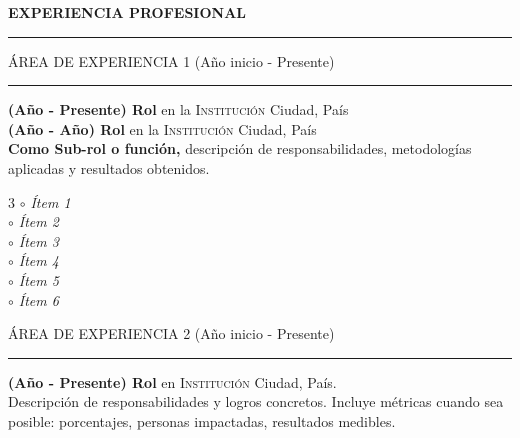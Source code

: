 \documentclass[10pt,a4paper]{article}
\begin{document}
\textbf{EXPERIENCIA PROFESIONAL}\vspace{-0.25cm}\\
\noindent\rule{\textwidth}{2pt}


\vspace{-0.1cm}ÁREA DE EXPERIENCIA 1 \hfill (Año inicio - Presente)\vspace{-0.20cm}
\noindent\rule{\textwidth}{0.1pt}
\textbf{(Año - Presente) Rol} en la \textsc{Institución} \hfill Ciudad, País\\
\textbf{(Año - Año) Rol} en la \textsc{Institución} \hfill Ciudad, País\\

\vspace{0.2cm}
\textbf{Como Sub-rol o función,} descripción de responsabilidades,
metodologías aplicadas y resultados obtenidos.

\vspace{0.2cm}
\begin{flushleft}
\begin{multicols}{3}\textit{
\hspace{-0.12cm}$\circ$ Ítem 1\\
$\circ$ Ítem 2\\
$\circ$ Ítem 3\\
$\circ$ Ítem 4\\
$\circ$ Ítem 5\\
$\circ$ Ítem 6}
\end{multicols}
\end{flushleft}

\vspace{-0.1cm}ÁREA DE EXPERIENCIA 2 \hfill (Año inicio - Presente)\vspace{-0.20cm}
\noindent\rule{\textwidth}{0.1pt}

\textbf{(Año - Presente) Rol} en \textsc{Institución} \hfill Ciudad, País.\\
Descripción de responsabilidades y logros concretos. Incluye métricas
cuando sea posible: porcentajes, personas impactadas, resultados medibles.
\end{document}
